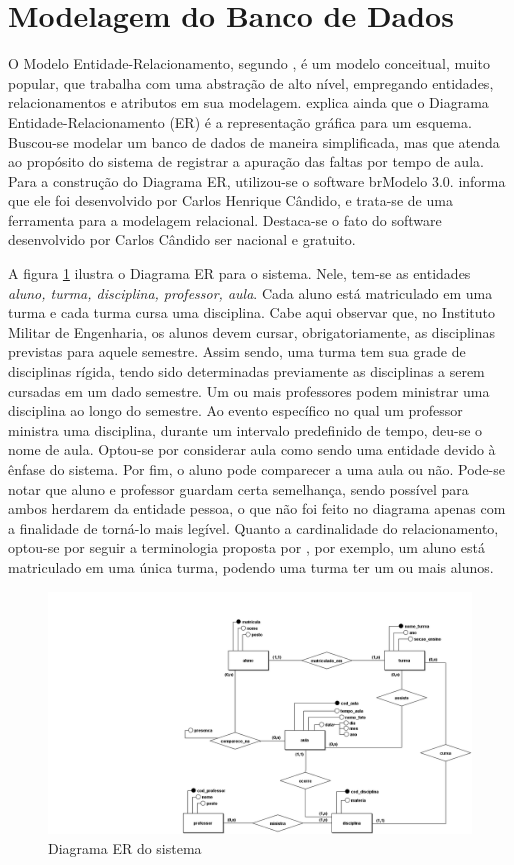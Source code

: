 \section{Modelagem do Banco de Dados}
\noindent 
O Modelo Entidade-Relacionamento, segundo \citep{bd}, é um modelo conceitual, muito popular, que trabalha com uma abstração de alto nível, empregando entidades, relacionamentos e atributos em sua modelagem.\citep{bd} explica ainda que o Diagrama Entidade-Relacionamento (ER) é a representação gráfica para um esquema. Buscou-se modelar um banco de dados de maneira simplificada, mas que atenda ao propósito do sistema de registrar a apuração das faltas por tempo de aula. Para a construção do Diagrama ER, utilizou-se o software brModelo 3.0. \citep{brmodelo} informa que ele foi desenvolvido por Carlos Henrique Cândido, e trata-se de uma ferramenta para a modelagem relacional. Destaca-se o fato do software desenvolvido por Carlos Cândido ser nacional e gratuito.    

A figura \ref{fig:figura60aa} ilustra o Diagrama ER para o sistema. Nele, tem-se as entidades \textit{aluno, turma, disciplina, professor, aula}. Cada aluno está matriculado em uma turma e cada turma cursa uma disciplina. Cabe aqui observar que, no Instituto Militar de Engenharia, os alunos devem cursar, obrigatoriamente, as disciplinas previstas para aquele semestre. Assim sendo, uma turma tem sua grade  de disciplinas rígida, tendo sido determinadas previamente as disciplinas a serem cursadas em um dado semestre. Um ou mais professores podem ministrar uma disciplina ao longo do semestre. Ao evento específico no qual um professor ministra uma disciplina, durante um intervalo predefinido de tempo, deu-se o nome de aula. Optou-se por considerar aula como sendo uma entidade devido à ênfase do sistema. Por fim, o aluno pode comparecer a uma aula ou não. Pode-se notar que aluno e professor guardam certa semelhança, sendo possível para ambos herdarem da entidade pessoa, o que não foi feito no diagrama apenas com a finalidade de torná-lo mais legível. Quanto a cardinalidade do relacionamento, optou-se por seguir a terminologia proposta por \citep{bdcardinalidade}, por exemplo, um aluno está matriculado em uma única turma, podendo uma turma ter um ou mais alunos. 

\begin{figure}[!ht]
	\centering
\includegraphics[width=1\textwidth]{img/Conceitual_1.png}   
	\caption{Diagrama ER do sistema}
	\label{fig:figura60aa}
\end{figure}


